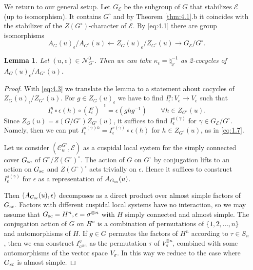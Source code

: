 \documentclass[11pt]{amsart}
\newtheorem{lem}[thm]{Lemma}
\theoremstyle{definition}
\newcommand{\ep}{\epsilon}
\def\cC{{\mathcal C}}
\def\cN{{\mathcal N}}
\def\cE{{\mathcal E}}
\def\sc{{\rm sc}}
\begin{document}
We return to our general setup.
Let $G_\cE$ be the subgroup of $G$ that stabilizes $\cE$ (up to isomorphism).
It contains $G^\circ$ and by Theorem \ref{thm:4.1}.b it coincides with the stabilizer 
of the $Z(G^\circ)$-character of $\cE$. By \eqref{eq:4.1} there are group
isomorphisms
\begin{equation}\label{eq:4.3}
A_G (u)_\epsilon / A_{G^\circ}(u) \leftarrow Z_G (u)_\epsilon / Z_{G^\circ}(u)
\to G_\cE / G^\circ .
\end{equation}

\begin{lem}\label{lem:4.2}
Let $(u,\epsilon) \in \cN_{G^\circ}^0$. Then we can take $\kappa_\epsilon = 
\natural_\cE^{-1}$ as 2-cocycles of $A_G (u)_\epsilon / A_{G^\circ}(u)$.
\end{lem}
\begin{proof}
With \eqref{eq:4.3} we translate the lemma to a statement about cocycles of \\
$Z_G (u)_\ep / Z_{G^\circ}(u)$. For $g \in Z_G (u)_\epsilon$ we have to find 
$I^g_\epsilon : V_\epsilon \to V_\epsilon$ such that
\begin{equation}\label{eq:3.1}
I^g_\epsilon \circ \epsilon (h) \circ (I^g_\epsilon)^{-1} = 
\epsilon (g h g^{-1}) \qquad \forall h \in Z_{G^\circ}(u) . 
\end{equation}
Since $Z_G (u) = s(G / G^\circ) Z_{G^\circ}(u)$, it suffices to find 
$I^{s (\gamma)}_\ep$ for $\gamma \in G_\cE / G^\circ$. Namely, then we can put
$I^{s(\gamma) h}_\epsilon = I^{s (\gamma)}_\epsilon \circ \epsilon (h)$ for
$h \in Z_{G^\circ}(u)$, as in \eqref{eq:1.7}.

Let us consider $(\cC_u^{G^\circ},\cE)$ as a cuspidal local system for the
simply connected cover $G_{\sc}$ of $G^\circ / Z(G^\circ)^\circ$. The action of
$G$ on $G^\circ$ by conjugation lifts to an action on $G_{\sc}$ and $Z(G^\circ)^\circ$
acts trivially on $\epsilon$. Hence it suffices to construct $I^{s(\gamma)}_\epsilon$
for $\epsilon$ as a representation of $A_{G_{\sc}}(u)$. 

Then $(A_{G_{\sc}}(u),\epsilon)$
decomposes as a direct product over almost simple factors of $G_{\sc}$. Factors
with different cuspidal local systems have no interaction, so we may assume that 
$G_{\sc} = H^n , \epsilon = \sigma^{\otimes n}$ with $H$ simply connected and almost
simple. The conjugation action of $G$ on $H^n$ is a combination of permutations of
$\{1,2,\ldots,n\}$ and automorphisms of $H$. If $g \in G$ permutes the factors of 
$H^n$ according to $\tau \in S_n$, then we can construct $I^g_{\sigma^{\otimes n}}$ 
as the permutation $\tau$ of $V_\sigma^{\otimes n}$, combined with some automorphisms
of the vector space $V_\sigma$. In this way we reduce to the case where $G_{\sc}$ is
almost simple. 


\end{proof}
\end{document}
